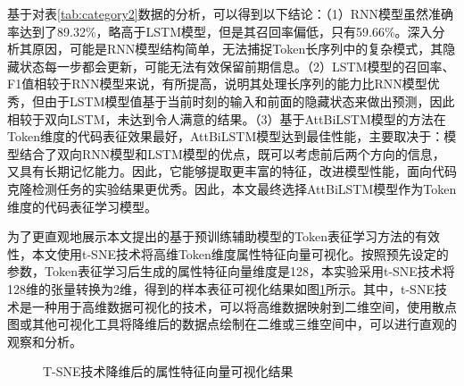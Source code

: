 基于对表\ref{tab:category2}数据的分析，可以得到以下结论：（1）RNN模型虽然准确率达到了89.32\%，略高于LSTM模型，但是其召回率偏低，只有59.66\%。深入分析其原因，可能是RNN模型结构简单，无法捕捉Token长序列中的复杂模式，其隐藏状态每一步都会更新，可能无法有效保留前期信息。（2）LSTM模型的召回率、F1值相较于RNN模型来说，有所提高，说明其处理长序列的能力比RNN模型优秀，但由于LSTM模型值基于当前时刻的输入和前面的隐藏状态来做出预测，因此相较于双向LSTM，未达到令人满意的结果。（3）基于AttBiLSTM模型的方法在Token维度的代码表征效果最好，AttBiLSTM模型达到最佳性能，主要取决于：模型结合了双向RNN模型和LSTM模型的优点，既可以考虑前后两个方向的信息，又具有长期记忆能力。因此，它能够提取更丰富的特征，改进模型性能，面向代码克隆检测任务的实验结果更优秀。因此，本文最终选择AttBiLSTM模型作为Token维度的代码表征学习模型。

为了更直观地展示本文提出的基于预训练辅助模型的Token表征学习方法的有效性，本文使用t-SNE技术将高维Token维度属性特征向量可视化。按照预先设定的参数，Token表征学习后生成的属性特征向量维度是128，本实验采用t-SNE技术将128维的张量转换为2维，得到的样本表征可视化结果如图\ref{fig:originone}所示。其中，t-SNE技术是一种用于高维数据可视化的技术，可以将高维数据映射到二维空间，使用散点图或其他可视化工具将降维后的数据点绘制在二维或三维空间中，可以进行直观的观察和分析。

\begin{figure}[htp] 
  \centering  %
  \caption{T-SNE技术降维后的属性特征向量可视化结果}    %
  \label{fig:originone}    %
\end{figure}

